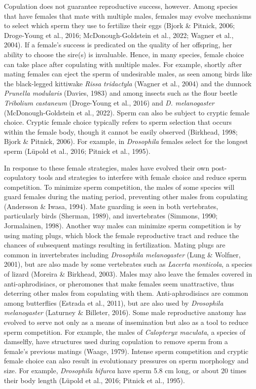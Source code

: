 \documentclass[12pt,reqno,oneside]{report}
\begin{document}
Copulation does not guarantee reproductive success, however. Among species that have females that mate with multiple males, females may evolve mechanisms to select which sperm they use to fertilize their eggs (Bjork \& Pitnick, 2006; Droge-Young et al., 2016; McDonough-Goldstein et al., 2022; Wagner et al., 2004). If a female's success is predicated on the quality of her offspring, her ability to choose the sire(s) is invaluable. Hence, in many species, female choice can take place after copulating with multiple males. For example, shortly after mating females can eject the sperm of undesirable males, as seen among birds like the black-legged kittiwake \textit{Rissa tridactyla} (Wagner et al., 2004) and the dunnock \textit{Prunella modularis} (Davies, 1983) and among insects such as the flour beetle \textit{Tribolium castaneum} (Droge-Young et al., 2016) and \textit{D. melanogaster} (McDonough-Goldstein et al., 2022). Sperm can also be subject to cryptic female choice. Cryptic female choice typically refers to sperm selection that occurs within the female body, though it cannot be easily observed (Birkhead, 1998; Bjork \& Pitnick, 2006). For example, in \textit{Drosophila} females select for the longest sperm (Lüpold et al., 2016; Pitnick et al., 1995). 

In response to these female strategies, males have evolved their own post-copulatory tools and strategies to interfere with female choice and reduce sperm competition. To minimize sperm competition, the males of some species will guard females during the mating period, preventing other males from copulating (Andersson \& Iwasa, 1994). Mate guarding is seen in both vertebrates, particularly birds (Sherman, 1989), and invertebrates (Simmons, 1990; Jormalainen, 1998). Another way males can minimize sperm competition is by using mating plugs, which block the female reproductive tract and reduce the chances of subsequent matings resulting in fertilization. Mating plugs are common in invertebrates including \textit{Drosophila melanogaster} (Lung \& Wolfner, 2001), but are also made by some vertebrates such as \textit{Lacerta monticola}, a species of lizard (Moreira \& Birkhead, 2003). Males may also leave the females covered in anti-aphrodisiacs, or pheromones that make females seem unattractive, thus deterring other males from copulating with them. Anti-aphrodisiacs are common among butterflies (Estrada et al., 2011), but are also used by \textit{Drosophila melanogaster} (Laturney \& Billeter, 2016). Some male reproductive anatomy has evolved to serve not only as a means of insemination but also as a tool to reduce sperm competition. For example, the males of \textit{Calopteryx maculata}, a species of damselfly, have structures used during copulation to remove sperm from a female's previous matings (Waage, 1979). Intense sperm competition and cryptic female choice can also result in evolutionary pressures on sperm morphology and size. For example, \textit{Drosophila bifurca} have sperm 5.8 cm long, or about 20 times their body length (Lüpold et al., 2016; Pitnick et al., 1995). 
\end{document}

